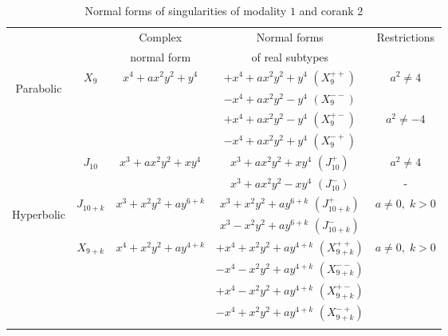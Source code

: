 \documentclass{amsproc}
\theoremstyle{definition}
\begin{document}
\begin{table}[tp]
\centering
\caption{Normal forms of singularities of modality $1$ and corank $2$}
\label{tab:normal_forms}
\begin{tabular}{|c|c|c|c|c|}
\hline

\multicolumn{1}{|c}{}
 & & Complex     & Normal forms     & \multirow{2}{*}{Restrictions} \\
\multicolumn{1}{|c}{}
 & & normal form & of real subtypes &                               \\
\hline\hline


\multirow{6}{*}{\begin{sideways}Parabolic\end{sideways}}

& \multirow{4}{*}{$X_9$} & \multirow{4}{*}{$x^4+ax^2y^2+y^4$}
  & $+x^4+ax^2y^2+y^4$ $(X_9^{++})$ & \multirow{2}{*}{$a^2\neq4$} \\\cline{4-4}
&&& $-x^4+ax^2y^2-y^4$ $(X_9^{--})$ &                             \\\cline{4-5}
&&& $+x^4+ax^2y^2-y^4$ $(X_9^{+-})$ & \multirow{2}{*}{$a^2\neq-4$}\\\cline{4-4}
&&& $-x^4+ax^2y^2+y^4$ $(X_9^{-+})$ &                             \\\cline{2-5}

& \multirow{2}{*}{$J_{10}$} & \multirow{2}{*}{$x^3+ax^2y^2+xy^4$}
  & $x^3+ax^2y^2+xy^4$ $(J_{10}^+)$ & $a^2 \neq 4$ \\ \cline{4-5}
&&& $x^3+ax^2y^2-xy^4$ $(J_{10}^-)$ & -            \\ \hline


\multirow{12}{*}{\begin{sideways}Hyperbolic\end{sideways}}

& \multirow{2}{*}{$J_{10+k}$} & \multirow{2}{*}{$x^3+x^2y^2+ay^{6+k}$}
  & $x^3+x^2y^2+ay^{6+k}$ $(J_{10+k}^+)$
      & \multirow{2}{*}{$a \neq 0,\; k > 0$} \\ \cline{4-4}
&&& $x^3-x^2y^2+ay^{6+k}$ $(J_{10+k}^-)$ &   \\ \cline{2-5}

& \multirow{4}{*}{$X_{9+k}$} & \multirow{4}{*}{$x^4+x^2y^2+ay^{4+k}$}
  & $+x^4+x^2y^2+ay^{4+k}$ $(X_{9+k}^{++})$
      & \multirow{4}{*}{$a \neq 0,\; k > 0$}  \\ \cline{4-4}
&&& $-x^4-x^2y^2+ay^{4+k}$ $(X_{9+k}^{--})$ & \\ \cline{4-4}
&&& $+x^4-x^2y^2+ay^{4+k}$ $(X_{9+k}^{+-})$ & \\ \cline{4-4}
&&& $-x^4+x^2y^2+ay^{4+k}$ $(X_{9+k}^{-+})$ & \\ \cline{2-5}


\end{tabular}
\end{table}
\end{document}
